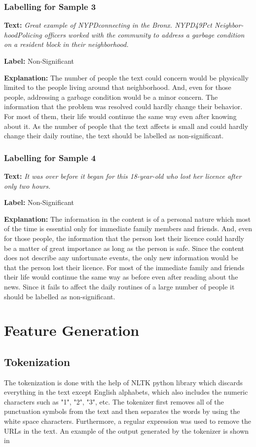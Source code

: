 \subsubsection{Labelling for Sample 3}
\textbf{Text:}
\textit{Great example of NYPDconnecting in the Bronx. NYPD49Pct Neighbor- hoodPolicing officers worked with the community to address a garbage condition on a resident block in their neighborhood.}\par
\textbf{Label:} Non-Significant\par
\textbf{Explanation:} The number of people the text could concern would be physically limited to the people living around that neighborhood. And, even for those people, addressing a garbage condition would be a minor concern. The information that the problem was resolved could hardly change their behavior. For most of them, their life would continue the same way even after knowing about it. As the number of people that the text affects is small and could hardly change their daily routine, the text should be labelled as non-significant.

\subsubsection{Labelling for Sample 4}
\textbf{Text:}
\textit{It was over before it began for this 18-year-old who lost her licence after only two hours.}\par
\textbf{Label:} Non-Significant\par
\textbf{Explanation:} The information in the content is of a personal nature which most of the time is essential only for immediate family members and friends. And, even for those people, the information that the person lost their licence could hardly be a matter of great importance as long as the person is safe. Since the content does not describe any unfortunate events, the only new information would be that the person lost their licence. For most of the immediate family and friends their life would continue the same way as before even after reading about the news. Since it fails to affect the daily routines of a large number of people it should be labelled as non-significant.

\section{Feature Generation}
\subsection{Tokenization}
The tokenization is done with the help of NLTK\cite{loper2002nltk} python library which discards everything in the text except English alphabets, which also includes the numeric characters such as "1", "2", "3", etc.  The tokenizer first removes all of the punctuation symbols from the text and then separates the words by using the white space characters. Furthermore, a regular expression was used to remove the URLs in the text. An example of the output generated by the tokenizer is shown in 

